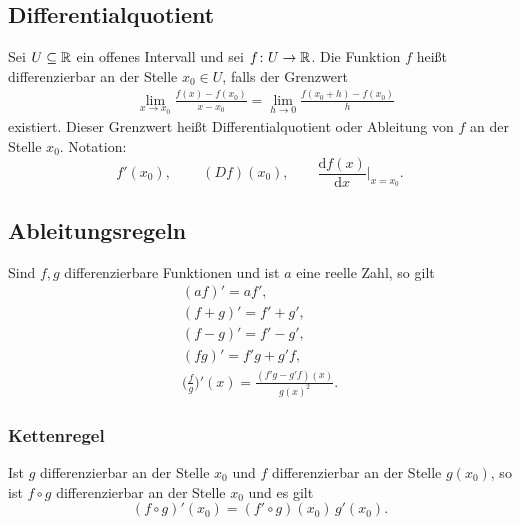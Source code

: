 \subsection{Differentialquotient}
Sei $U\subseteq\mathbb R$ ein offenes Intervall
und sei $f\colon U\to\mathbb R$. Die Funktion $f$ heißt
differenzierbar
an der Stelle $x_0\in U$, falls der Grenzwert
\begin{equation}
\begin{split}
&\lim_{x\to x_0} \frac{f(x)-f(x_0)}{x-x_0}
= \lim_{h\to 0}\frac{f(x_0+h)-f(x_0)}{h}
\end{split}
\end{equation}
existiert. Dieser Grenzwert heißt
Differentialquotient oder Ableitung
von $f$ an der Stelle $x_0$. Notation:
\begin{equation}
f'(x_0),\,\qquad (Df)(x_0),\qquad \frac{\mathrm df(x)}{\mathrm dx}\Big|_{x=x_0}.
\end{equation}

\subsection{Ableitungsregeln}
Sind $f,g$ differenzierbare Funktionen und ist $a$ eine reelle Zahl,
so gilt
\begin{gather}
(af)' = af',\\
(f+g)' = f'+g',\\
(f-g)' = f'-g',\\
(fg)' = f'g+g'f,\\
\Big(\frac{f}{g}\Big)'(x) = \frac{(f'g-g'f)(x)}{g(x)^2}.
\end{gather}
\subsubsection{Kettenregel}
Ist $g$ differenzierbar an der Stelle $x_0$ und
$f$ differenzierbar an der Stelle $g(x_0)$, so ist $f\circ g$
differenzierbar an der Stelle $x_0$ und es gilt
\begin{equation}
(f\circ g)'(x_0) = (f'\circ g)(x_0)\, g'(x_0).
\end{equation}

